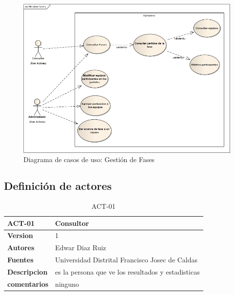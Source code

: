 \begin{figure}[H]
	\centering
	\includegraphics[width=1\linewidth]{Designe/imgs/gestionF}
	\caption{Diagrama de casos de uso: Gestión de Fases}
	\label{fig:gestionF}
\end{figure}




\subsection{Definición de actores}
 
 
 
\begin{table}[H]
	\centering
	\caption{ACT-01}
	\label{ACT-01}
	\begin{tabular}{|l|l|}
		\hline
		\textbf{ACT-01}      & \textbf{Consultor}                                 \\ \hline
		\textbf{Version}     & 1                                                  \\ \hline
		\textbf{Autores}     & Edwar Diaz Ruiz                                    \\ \hline
		\textbf{Fuentes}     & Universidad Distrital Francisco Josec de Caldas    \\ \hline
		\textbf{Descripcion} & es la persona que ve los resultados y estadisticas \\ \hline
		\textbf{comentarios} & ninguno             \\ \hline
	\end{tabular}
\end{table}

